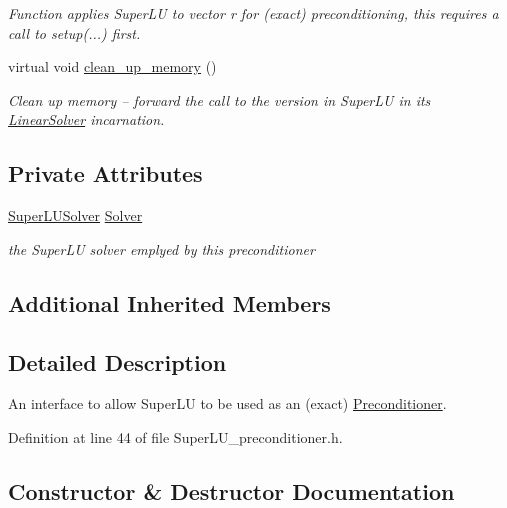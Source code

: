 \begin{DoxyCompactItemize}
\begin{DoxyCompactList}\small\item\em Function applies Super\+LU to vector r for (exact) preconditioning, this requires a call to setup(...) first. \end{DoxyCompactList}\item 
virtual void \hyperlink{classoomph_1_1SuperLUPreconditioner_aa0a50217f8416c55af700cbedd750900}{clean\+\_\+up\+\_\+memory} ()
\begin{DoxyCompactList}\small\item\em Clean up memory -- forward the call to the version in Super\+LU in its \hyperlink{classoomph_1_1LinearSolver}{Linear\+Solver} incarnation. \end{DoxyCompactList}\end{DoxyCompactItemize}
\subsection*{Private Attributes}
\begin{DoxyCompactItemize}
\item 
\hyperlink{classoomph_1_1SuperLUSolver}{Super\+L\+U\+Solver} \hyperlink{classoomph_1_1SuperLUPreconditioner_a4da1fff0fd1a2a57d5dfe66e591cf19a}{Solver}
\begin{DoxyCompactList}\small\item\em the Super\+LU solver emplyed by this preconditioner \end{DoxyCompactList}\end{DoxyCompactItemize}
\subsection*{Additional Inherited Members}


\subsection{Detailed Description}
An interface to allow Super\+LU to be used as an (exact) \hyperlink{classoomph_1_1Preconditioner}{Preconditioner}. 

Definition at line 44 of file Super\+L\+U\+\_\+preconditioner.\+h.



\subsection{Constructor \& Destructor Documentation}
\mbox{\label{classoomph_1_1SuperLUPreconditioner_a60f0201dc7d7b4ca3aedcc07faf33d13}} 
